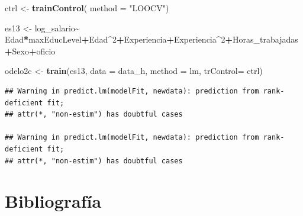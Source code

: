 \documentclass[
]{article}
\newenvironment{Shaded}{\begin{snugshade}}{\end{snugshade}}
\newcommand{\AttributeTok}[1]{\textcolor[rgb]{0.13,0.29,0.53}{#1}}
\newcommand{\DecValTok}[1]{\textcolor[rgb]{0.00,0.00,0.81}{#1}}
\newcommand{\FunctionTok}[1]{\textcolor[rgb]{0.13,0.29,0.53}{\textbf{#1}}}
\newcommand{\NormalTok}[1]{#1}
\newcommand{\OtherTok}[1]{\textcolor[rgb]{0.56,0.35,0.01}{#1}}
\newcommand{\SpecialCharTok}[1]{\textcolor[rgb]{0.81,0.36,0.00}{\textbf{#1}}}
\newcommand{\StringTok}[1]{\textcolor[rgb]{0.31,0.60,0.02}{#1}}
\begin{document}
\begin{Shaded}
\begin{Highlighting}[]
\NormalTok{ctrl }\OtherTok{\textless{}{-}} \FunctionTok{trainControl}\NormalTok{(}
  \AttributeTok{method =} \StringTok{"LOOCV"}\NormalTok{)}

\NormalTok{es13 }\OtherTok{\textless{}{-}}\NormalTok{ log\_salario}\SpecialCharTok{\textasciitilde{}}\NormalTok{ Edad}\SpecialCharTok{*}\NormalTok{maxEducLevel}\SpecialCharTok{+}\NormalTok{Edad}\SpecialCharTok{\^{}}\DecValTok{2}\SpecialCharTok{+}\NormalTok{Experiencia}\SpecialCharTok{+}\NormalTok{Experiencia}\SpecialCharTok{\^{}}\DecValTok{2}\SpecialCharTok{+}\NormalTok{Horas\_trabajadas}\SpecialCharTok{+}\NormalTok{Sexo}\SpecialCharTok{+}\NormalTok{oficio}

\NormalTok{odelo2c }\OtherTok{\textless{}{-}} \FunctionTok{train}\NormalTok{(es13,}
                  \AttributeTok{data =}\NormalTok{ data\_h,}
                  \AttributeTok{method =} \StringTok{\textquotesingle{}lm\textquotesingle{}}\NormalTok{, }
                  \AttributeTok{trControl=}\NormalTok{ ctrl)}
\end{Highlighting}
\end{Shaded}

\begin{verbatim}
## Warning in predict.lm(modelFit, newdata): prediction from rank-deficient fit;
## attr(*, "non-estim") has doubtful cases

## Warning in predict.lm(modelFit, newdata): prediction from rank-deficient fit;
## attr(*, "non-estim") has doubtful cases
\end{verbatim}

\begin{Shaded}
\begin{Highlighting}[]

\end{Highlighting}
\end{Shaded}

\hypertarget{bibliografuxeda}{%
\section{Bibliografía}\label{bibliografuxeda}}
\end{document}
